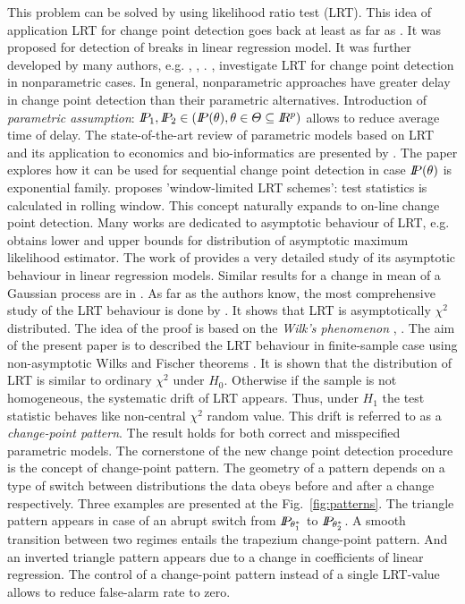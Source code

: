 This problem can be solved by using likelihood ratio test (LRT). This idea of application LRT for change point detection  goes back at least as far as \citet{quandt1960tests}. It was proposed for detection of breaks in linear regression model. It was further developed by many authors, e.g. \citet{kim1989likelihood}, \citet{haccou1987likelihood}, \citet{srivastava1986likelihood}. \citet{liu2008empirical}, \citet{zou2007empirical} investigate LRT for change point detection in nonparametric cases. In general, nonparametric approaches have greater delay in change point detection than their parametric alternatives. Introduction of \textit{parametric assumption}: $\P_1, \P_2 \in (\P(\theta), \theta \in \Theta \subseteq \R^p)$ allows to reduce average time of delay. The state-of-the-art review of parametric models based on LRT and its application to economics and bio-informatics are presented by \citet{ParStatChen}.  The paper \citet{gombay2000sequential} explores how it can be used for sequential change point detection in case $\P(\theta)$ is exponential family. \citet{lai1995sequential} proposes 'window-limited LRT schemes': test statistics is calculated in rolling window. This concept naturally expands to on-line change point detection. Many works are dedicated to asymptotic behaviour of LRT, e.g. \citet{jandhyala1999capturing} obtains lower and upper bounds for distribution of asymptotic maximum likelihood estimator. The work of \citet{kim1994tests} provides a very detailed study of its asymptotic behaviour in linear regression models. Similar results for a change in mean of a Gaussian process are in \citet{fotopoulos2010exact}. As far as the authors know, the most comprehensive study of the LRT behaviour is done by \citet{LRTWilks}. It shows that LRT is asymptotically $\chi^2$ distributed. The idea of the proof is based on the \textit{Wilk's phenomenon} \citet{wilks1938large}, \citet{boucheron2011high}. 
The aim of the present paper is to described the LRT behaviour in finite-sample case using non-asymptotic Wilks and Fischer theorems \citet{wilks2013}. It is shown that the distribution of LRT is similar to ordinary $\chi^2$ under $H_0$. Otherwise if the sample is not homogeneous, the systematic drift of LRT appears. Thus, under $H_1$ the test statistic behaves like non-central $\chi^2$ random value. This drift is referred to as a \textit{change-point pattern}. The result holds for both correct and misspecified parametric models. 
The cornerstone of the new change point detection procedure is the concept of change-point pattern. The geometry of a pattern depends on a type of switch between distributions the data obeys before and after a change respectively. Three examples are presented at the Fig.~\ref{fig:patterns}. The triangle pattern appears in case of an abrupt switch from $\P_{\theta_1^*}$ to $\P_{\theta_2^*}$. A smooth transition between two regimes entails the trapezium change-point pattern. And an inverted triangle pattern appears due to a change in coefficients of linear regression. The control of a change-point pattern instead of a single LRT-value allows to reduce false-alarm rate to zero.

